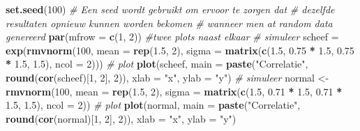 \documentclass[12pt,dutch,coursenotes]{book}
\newenvironment{Shaded}{\begin{snugshade}}{\end{snugshade}}
\newcommand{\KeywordTok}[1]{\textcolor[rgb]{0.13,0.29,0.53}{\textbf{#1}}}
\newcommand{\DataTypeTok}[1]{\textcolor[rgb]{0.13,0.29,0.53}{#1}}
\newcommand{\DecValTok}[1]{\textcolor[rgb]{0.00,0.00,0.81}{#1}}
\newcommand{\FloatTok}[1]{\textcolor[rgb]{0.00,0.00,0.81}{#1}}
\newcommand{\StringTok}[1]{\textcolor[rgb]{0.31,0.60,0.02}{#1}}
\newcommand{\CommentTok}[1]{\textcolor[rgb]{0.56,0.35,0.01}{\textit{#1}}}
\newcommand{\OperatorTok}[1]{\textcolor[rgb]{0.81,0.36,0.00}{\textbf{#1}}}
\newcommand{\NormalTok}[1]{#1}
\theoremstyle{definition}
\theoremstyle{definition}
\theoremstyle{definition}
\theoremstyle{remark}
\begin{document}
\begin{Shaded}
\begin{Highlighting}[]
\KeywordTok{set.seed}\NormalTok{(}\DecValTok{100}\NormalTok{)}
\CommentTok{# Een seed wordt gebruikt om ervoor te zorgen dat}
\CommentTok{# dezelfde resultaten opnieuw kunnen worden bekomen}
\CommentTok{# wanneer men at random data genereerd}
\KeywordTok{par}\NormalTok{(}\DataTypeTok{mfrow =} \KeywordTok{c}\NormalTok{(}\DecValTok{1}\NormalTok{, }\DecValTok{2}\NormalTok{))  }\CommentTok{#twee plots naast elkaar}
\CommentTok{# simuleer}
\NormalTok{scheef =}\StringTok{ }\KeywordTok{exp}\NormalTok{(}\KeywordTok{rmvnorm}\NormalTok{(}\DecValTok{100}\NormalTok{, }\DataTypeTok{mean =} \KeywordTok{rep}\NormalTok{(}\FloatTok{1.5}\NormalTok{, }\DecValTok{2}\NormalTok{), }\DataTypeTok{sigma =} \KeywordTok{matrix}\NormalTok{(}\KeywordTok{c}\NormalTok{(}\FloatTok{1.5}\NormalTok{, }
    \FloatTok{0.75} \OperatorTok{*}\StringTok{ }\FloatTok{1.5}\NormalTok{, }\FloatTok{0.75} \OperatorTok{*}\StringTok{ }\FloatTok{1.5}\NormalTok{, }\FloatTok{1.5}\NormalTok{), }\DataTypeTok{ncol =} \DecValTok{2}\NormalTok{)))}
\CommentTok{# plot}
\KeywordTok{plot}\NormalTok{(scheef, }\DataTypeTok{main =} \KeywordTok{paste}\NormalTok{(}\StringTok{"Correlatie"}\NormalTok{, }\KeywordTok{round}\NormalTok{(}\KeywordTok{cor}\NormalTok{(scheef)[}\DecValTok{1}\NormalTok{, }
    \DecValTok{2}\NormalTok{], }\DecValTok{2}\NormalTok{)), }\DataTypeTok{xlab =} \StringTok{"x"}\NormalTok{, }\DataTypeTok{ylab =} \StringTok{"y"}\NormalTok{)}
\CommentTok{# simuleer}
\NormalTok{normal <-}\StringTok{ }\KeywordTok{rmvnorm}\NormalTok{(}\DecValTok{100}\NormalTok{, }\DataTypeTok{mean =} \KeywordTok{rep}\NormalTok{(}\FloatTok{1.5}\NormalTok{, }\DecValTok{2}\NormalTok{), }\DataTypeTok{sigma =} \KeywordTok{matrix}\NormalTok{(}\KeywordTok{c}\NormalTok{(}\FloatTok{1.5}\NormalTok{, }
    \FloatTok{0.71} \OperatorTok{*}\StringTok{ }\FloatTok{1.5}\NormalTok{, }\FloatTok{0.71} \OperatorTok{*}\StringTok{ }\FloatTok{1.5}\NormalTok{, }\FloatTok{1.5}\NormalTok{), }\DataTypeTok{ncol =} \DecValTok{2}\NormalTok{))}
\CommentTok{# plot}
\KeywordTok{plot}\NormalTok{(normal, }\DataTypeTok{main =} \KeywordTok{paste}\NormalTok{(}\StringTok{"Correlatie"}\NormalTok{, }\KeywordTok{round}\NormalTok{(}\KeywordTok{cor}\NormalTok{(normal)[}\DecValTok{1}\NormalTok{, }
    \DecValTok{2}\NormalTok{], }\DecValTok{2}\NormalTok{)), }\DataTypeTok{xlab =} \StringTok{"x"}\NormalTok{, }\DataTypeTok{ylab =} \StringTok{"y"}\NormalTok{)}
\end{Highlighting}
\end{Shaded}
\end{document}
